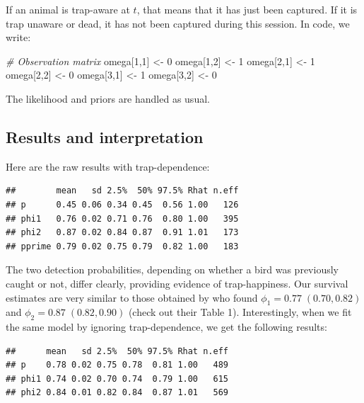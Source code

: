 \documentclass[
  12pt,
]{krantz}
\newenvironment{Shaded}{\begin{snugshade}}{\end{snugshade}}
\newcommand{\CommentTok}[1]{\textcolor[rgb]{0.56,0.35,0.01}{\textit{#1}}}
\newcommand{\DecValTok}[1]{\textcolor[rgb]{0.00,0.00,0.81}{#1}}
\newcommand{\NormalTok}[1]{#1}
\newcommand{\OtherTok}[1]{\textcolor[rgb]{0.56,0.35,0.01}{#1}}
\begin{document}
If an animal is trap-aware at \(t\), that means that it has just been captured. If it is trap unaware or dead, it has not been captured during this session. In code, we write:

\begin{Shaded}
\begin{Highlighting}[]
\CommentTok{\# Observation matrix}
\NormalTok{  omega[}\DecValTok{1}\NormalTok{,}\DecValTok{1}\NormalTok{] }\OtherTok{\textless{}{-}} \DecValTok{0}
\NormalTok{  omega[}\DecValTok{1}\NormalTok{,}\DecValTok{2}\NormalTok{] }\OtherTok{\textless{}{-}} \DecValTok{1}
\NormalTok{  omega[}\DecValTok{2}\NormalTok{,}\DecValTok{1}\NormalTok{] }\OtherTok{\textless{}{-}} \DecValTok{1}
\NormalTok{  omega[}\DecValTok{2}\NormalTok{,}\DecValTok{2}\NormalTok{] }\OtherTok{\textless{}{-}} \DecValTok{0}
\NormalTok{  omega[}\DecValTok{3}\NormalTok{,}\DecValTok{1}\NormalTok{] }\OtherTok{\textless{}{-}} \DecValTok{1}
\NormalTok{  omega[}\DecValTok{3}\NormalTok{,}\DecValTok{2}\NormalTok{] }\OtherTok{\textless{}{-}} \DecValTok{0}
\end{Highlighting}
\end{Shaded}

The likelihood and priors are handled as usual.

\subsection{Results and interpretation}\label{results-and-interpretation-3}

Here are the raw results with trap-dependence:

\begin{verbatim}
##        mean   sd 2.5%  50% 97.5% Rhat n.eff
## p      0.45 0.06 0.34 0.45  0.56 1.00   126
## phi1   0.76 0.02 0.71 0.76  0.80 1.00   395
## phi2   0.87 0.02 0.84 0.87  0.91 1.01   173
## pprime 0.79 0.02 0.75 0.79  0.82 1.00   183
\end{verbatim}

The two detection probabilities, depending on whether a bird was previously caught or not, differ clearly, providing evidence of trap-happiness. Our survival estimates are very similar to those obtained by \citet{pradeltrapdep2012} who found \(\phi_1 = 0.77\; (0.70, 0.82)\) and \(\phi_2 = 0.87\; (0.82,0.90)\) (check out their Table 1). Interestingly, when we fit the same model by ignoring trap-dependence, we get the following results:

\begin{verbatim}
##      mean   sd 2.5%  50% 97.5% Rhat n.eff
## p    0.78 0.02 0.75 0.78  0.81 1.00   489
## phi1 0.74 0.02 0.70 0.74  0.79 1.00   615
## phi2 0.84 0.01 0.82 0.84  0.87 1.01   569
\end{verbatim}
\end{document}
